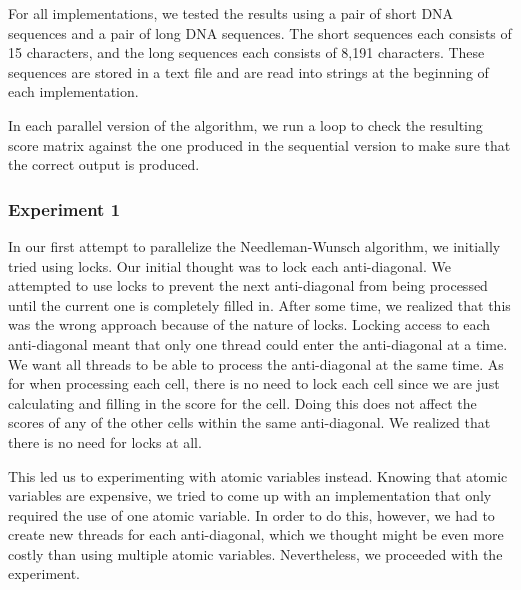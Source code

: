 \documentclass[conference]{IEEEtran}
\begin{document}
For all implementations, we tested the results using a pair of short DNA sequences and a pair of long DNA sequences. The short sequences each consists of 15 characters, and the long sequences each consists of 8,191 characters. These sequences are stored in a text file and are read into strings at the beginning of each implementation.

In each parallel version of the algorithm, we run a loop to check the resulting score matrix against the one produced in the sequential version to make sure that the correct output is produced.

\subsubsection{Experiment 1}
In our first attempt to parallelize the Needleman-Wunsch algorithm, we initially tried using locks. Our initial thought was to lock each anti-diagonal. We attempted to use locks to prevent the next anti-diagonal from being processed until the current one is completely filled in. After some time, we realized that this was the wrong approach because of the nature of locks. Locking access to each anti-diagonal meant that only one thread could enter the anti-diagonal at a time. We want all threads to be able to process the anti-diagonal at the same time. As for when processing each cell, there is no need to lock each cell since we are just calculating and filling in the score for the cell. Doing this does not affect the scores of any of the other cells within the same anti-diagonal. We realized that there is no need for locks at all.

This led us to experimenting with atomic variables instead. Knowing that atomic variables are expensive, we tried to come up with an implementation that only required the use of one atomic variable. In order to do this, however, we had to create new threads for each anti-diagonal, which we thought might be even more costly than using multiple atomic variables. Nevertheless, we proceeded with the experiment.
\end{document}
